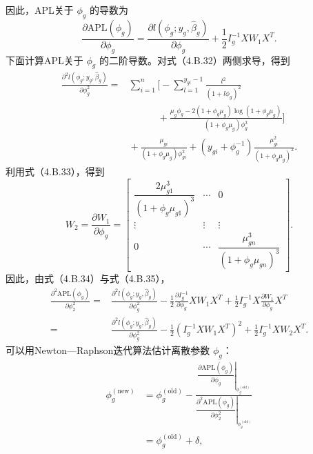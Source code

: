 因此，APL关于 $\phi_g$ 的导数为
\begin{equation}
\frac{\partial\mathrm{APL}(\phi_g)}{\partial\phi_g}
=\frac{\partial l(\phi_g;y_g,\widehat\beta_g)}{\partial\phi_g}
+\frac12I_g^{-1}XW_1X^T.\tag{4.B.35}
\end{equation}
下面计算APL关于 $\phi_g$ 的二阶导数。对式（4.B.32）两侧求导，得到
\begin{equation}
\begin{aligned}
\frac{\partial^2l(\phi_g;y_g,\widehat\beta_g)}{\partial\phi_g^2}
={}&\sum_{i=1}^{n}\biggl[-\sum_{l=1}^{y_{gi}-1}\frac{l^2}{(1+l\phi_g)^2}\\
&\hspace{3em}{}+\frac{\mu_g\phi_g-2(1+\phi_g\mu_g)\log(1+\phi_g\mu_g)}{
 (1+\phi_g\mu_g)\phi_g^3}\biggr]\\
&{}+\frac{\mu_{gi}}{(1+\phi_g\mu_g)\phi_{gi}^2}
+(y_{gi}+\phi_g^{-1})\frac{\mu_{gi}^2}{(1+\phi_g\mu_g)^2}.
\end{aligned}\tag{4.B.36}
\end{equation}
利用式（4.B.33），得到
\begin{equation}
W_2=\frac{\partial W_1}{\partial\phi_g}=
\begin{bmatrix}
\dfrac{2\mu_{g1}^3}{(1+\phi_g\mu_{g1})^3}&\cdots&0\\
\vdots&\vdots&\vdots\\
0&\cdots&\dfrac{\mu_{gn}^3}{(1+\phi_g\mu_{gn})^3}
\end{bmatrix}.\tag{4.B.37}
\end{equation}
因此，由式（4.B.34）与式（4.B.35），
\[
\begin{aligned}
\frac{\partial^2\mathrm{APL}(\phi_g)}{\partial\phi_2^2}
={}&\frac{\partial^2l(\phi_g;y_g,\widehat\beta_g)}{\partial\phi_g^2}
-\frac12\frac{\partial I_g^{-1}}{\partial\phi_g}XW_1X^T
+\frac12I_g^{-1}X\frac{\partial W_1}{\partial\phi_g}X^T\\
={}&\frac{\partial^2l(\phi_g;y_g,\widehat\beta_g)}{\partial\phi_g^2}
-\frac12(I_g^{-1}XW_1X^T)^2+\frac12I_g^{-1}XW_2X^T.
\end{aligned}
\]
可以用Newton—Raphson迭代算法估计离散参数 $\phi_g$：
\begin{equation}
\begin{aligned}
\phi_g^{(\mathrm{new})}
&=\phi_g^{(\mathrm{old})}
-\frac{\left.\dfrac{\partial\mathrm{APL}(\phi_g)}{\partial\phi_g}
 \right|_{\phi_g^{(\mathrm{old})}}}{
 \left.\dfrac{\partial^2\mathrm{APL}(\phi_g)}{\partial\phi_2^2}
 \right|_{\phi_g^{(\mathrm{old})}}}\\
&=\phi_g^{(\mathrm{old})}+\delta,
\end{aligned}\tag{4.B.38}
\end{equation}
